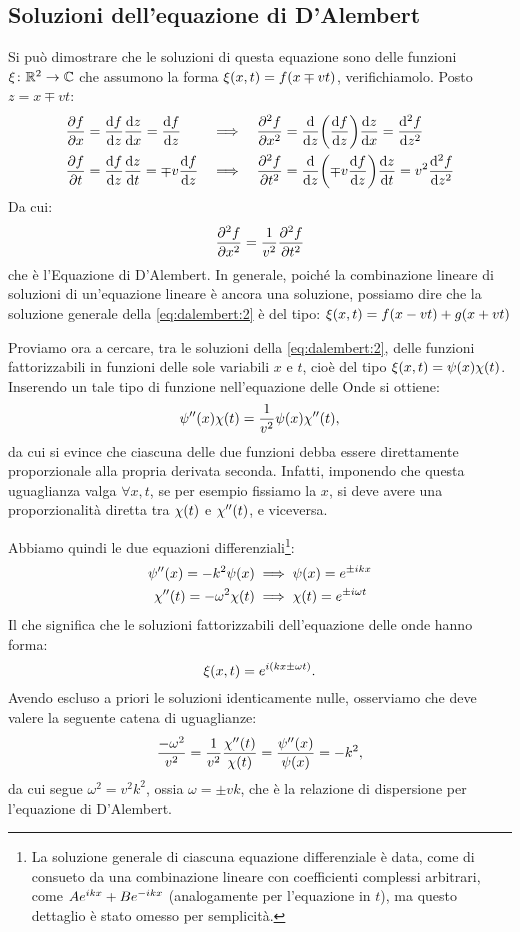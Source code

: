     \subsection{Soluzioni dell'equazione di D'Alembert}
        Si pu\`o dimostrare che le soluzioni di questa equazione sono delle funzioni $\xi\colon\mathbb{R}^2\rightarrow\mathbb{C}$ che assumono la forma $\xi\qty(x,t)=f\qty(x\mp vt)$, verifichiamolo. Posto $z=x\mp vt$:
        \begin{align*}
            &\pdv{f}{x}=\dv{f}{z}\dv{z}{x}=\dv{f}{z}      &\implies& \quad\pdv[2]{f}{x}=\dv{z}\qty(\dv{f}{z})\dv{z}{x}=\dv[2]{f}{z}\\
            &\pdv{f}{t}=\dv{f}{z}\dv{z}{t}=\mp v\dv{f}{z} &\implies& \quad\pdv[2]{f}{t}=\dv{z}\qty(\mp v\dv{f}{z})\dv{z}{t}=v^2\dv[2]{f}{z}
        \end{align*}
        Da cui:
            $$\pdv[2]{f}{x}=\frac{1}{v^2}\pdv[2]{f}{t}$$
        che \`e l'Equazione di D'Alembert. In generale, poich\'e la combinazione lineare di soluzioni di un'equazione lineare \`e ancora una soluzione, possiamo dire che la soluzione generale della \eqref{eq:dalembert:2} \`e del tipo: $\xi\qty(x,t)=f(x-vt)+g(x+vt)$
        \par Proviamo ora a cercare, tra le soluzioni della \eqref{eq:dalembert:2}, delle funzioni fattorizzabili in funzioni delle sole variabili $x$ e $t$, cio\`e del tipo $\xi\qty(x,t)=\psi\qty(x)\chi\qty(t)$. Inserendo un tale tipo di funzione nell'equazione delle Onde si ottiene:
            $$\psi''\qty(x)\chi\qty(t)=\frac{1}{v^2}\psi\qty(x)\chi''\qty(t),$$
        da cui si evince che ciascuna delle due funzioni debba essere direttamente proporzionale alla propria derivata seconda. Infatti, imponendo che questa uguaglianza valga $\forall x,t$, se per esempio fissiamo la $x$, si deve avere una proporzionalit\`a diretta tra $\chi\qty(t)$ e $\chi''\qty(t)$, e viceversa.
        \par Abbiamo quindi le due equazioni differenziali\footnote{La soluzione generale di ciascuna equazione differenziale \`e data, come di consueto da una combinazione lineare con coefficienti complessi arbitrari, come $Ae^{ikx}+Be^{-ikx}$ (analogamente per l'equazione in $t$), ma questo dettaglio \`e stato omesso per semplicit\`a.}:
        \begin{align*}
            \psi''\qty(x)=-k^2\psi\qty(x)       &\implies \psi\qty(x)=e^{\pm ikx}\\
            \chi''\qty(t)=-\omega^2\chi\qty(t)  &\implies \chi\qty(t)=e^{\pm i\omega t}
        \end{align*}
        Il che significa che le soluzioni fattorizzabili dell'equazione delle onde hanno forma:
        \begin{equation}
            \xi\qty(x,t)=e^{i\qty(kx\pm\omega t)}.
        \end{equation}
        Avendo escluso a priori le soluzioni identicamente nulle, osserviamo che deve valere la seguente catena di uguaglianze:
            $$\frac{-\omega^2}{v^2}=\frac{1}{v^2}\frac{\chi''\qty(t)}{\chi\qty(t)}=\frac{\psi''\qty(x)}{\psi\qty(x)}=-k^2,$$
        da cui segue $\omega^2=v^2k^2$, ossia $\omega=\pm vk$, che \`e la relazione di dispersione per l'equazione di D'Alembert.
